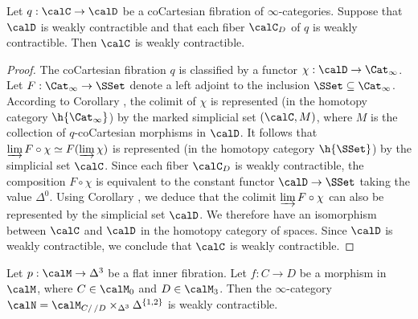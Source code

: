 \begin{lemma}\label{sadly}
Let $q: \calC \rightarrow \calD$ be a coCartesian fibration of $\infty$-categories.
Suppose that $\calD$ is weakly contractible and that each fiber $\calC_{D}$ of $q$ is
weakly contractible. Then $\calC$ is weakly contractible.
\end{lemma}

\begin{proof}
The coCartesian fibration $q$ is classified by a functor $\chi: \calD \rightarrow
\Cat_{\infty}$. Let $F: \Cat_{\infty} \rightarrow \SSet$ denote a left adjoint
to the inclusion $\SSet \subseteq \Cat_{\infty}$. According to Corollary ,
the colimit of $\chi$ is represented (in the homotopy category $\h{\Cat_{\infty}}$)
by the marked simplicial set $(\calC, M)$, where $M$ is the collection of $q$-coCartesian morphisms in $\calD$. It follows that $\varinjlim F \circ \chi \simeq F( \varinjlim \chi)$ is represented
(in the homotopy category $\h{ \SSet}$) by the simplicial set $\calC$. Since each
fiber $\calC_{D}$ is weakly contractible, the composition $F \circ \chi$ is equivalent to the
constant functor $\calD \rightarrow \SSet$ taking the value $\Delta^0$. Using Corollary
, we deduce that the colimit $\varinjlim F \circ \chi$ can also be represented
by the simplicial set $\calD$. We therefore have an isomorphism between $\calC$ and $\calD$ in the homotopy category of spaces. Since $\calD$ is weakly contractible, we conclude that $\calC$ is weakly contractible.
\end{proof}

\begin{lemma}\label{cast1}
Let $p: \calM \rightarrow \Delta^3$ be a flat inner fibration. Let
$f: C \rightarrow D$ be a morphism in $\calM$, where $C \in \calM_0$ and
$D \in \calM_3$. Then the $\infty$-category
$\calN = \calM_{ C/ \, /D} \times_{ \Delta^3} \Delta^{ \{1,2\} }$ is weakly contractible.
\end{lemma}

